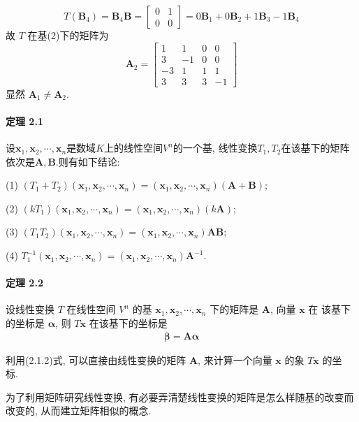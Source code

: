 $$
    T(\bm{B}_{4}) = \bm{B}_{4}\bm{B} = \begin{bmatrix}
        0 & 1 \\
        0 & 0
    \end{bmatrix} = 0 \bm{B}_{1} + 0 \bm{B}_{2} + 1 \bm{B}_{3} - 1 \bm{B}_{4}
$$
故 $T$ 在基(2)下的矩阵为
$$
    \bm{A}_2 = \begin{bmatrix}
        1  & 1  & 0 & 0  \\
        3  & -1 & 0 & 0  \\
        -3 & 1  & 1 & 1  \\
        3  & 3  & 3 & -1
    \end{bmatrix}
$$
显然 $\bm{A}_1 \neq \bm{A}_2$.

\paragraph*{定理 2.1} 设$\bm{x}_1,\bm{x}_2,\cdots,\bm{x}_n$是数域$K$上的线性空间$V^n$的一个基, 线性变换$T_1, T_2$在该基下的矩阵
依次是$\bm{A}, \bm{B}$.则有如下结论:
\par(1) $(T_1 + T_2)(\bm{x}_1,\bm{x}_2,\cdots,\bm{x}_n) = (\bm{x}_1,\bm{x}_2,\cdots,\bm{x}_n)(\bm{A} + \bm{B})$;
\par(2) $(kT_1)(\bm{x}_1,\bm{x}_2,\cdots,\bm{x}_n) = (\bm{x}_1,\bm{x}_2,\cdots,\bm{x}_n)(k\bm{A})$;
\par(3) $(T_1T_2)(\bm{x}_1,\bm{x}_2,\cdots,\bm{x}_n) = (\bm{x}_1,\bm{x}_2,\cdots,\bm{x}_n)\bm{AB}$;
\par(4) $T_1^{-1}(\bm{x}_1,\bm{x}_2,\cdots,\bm{x}_n) = (\bm{x}_1,\bm{x}_2,\cdots,\bm{x}_n) \bm{A}^{-1}$.

\paragraph*{定理 2.2} 设线性变换 $T$ 在线性空间 $V^n$ 的基 $\bm{x}_1, \bm{x}_2, \cdots, \bm{x}_n$ 下的矩阵是 $\bm{A}$, 向量 $\bm{x}$ 在
该基下的坐标是 $\bm{\alpha}$, 则 $T\bm{x}$ 在该基下的坐标是
\begin{gather}
    \bm{\beta} = \bm{A\alpha}
    \tag{2.1.2}
\end{gather}

\par 利用(2.1.2)式, 可以直接由线性变换的矩阵 $\bm{A}$, 来计算一个向量 $\bm{x}$ 的象 $T\bm{x}$ 的坐
标.

\par 为了利用矩阵研究线性变换, 有必要弄清楚线性变换的矩阵是怎么样随基的改变而改变的, 从而建立矩阵相似的概念.

